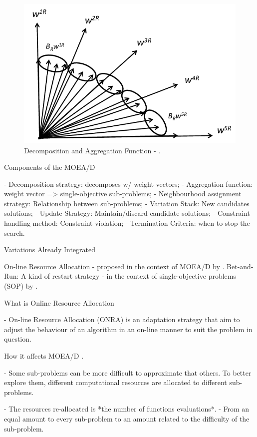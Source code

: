 \begin{figure}[!t]
	\centering
	\includegraphics[width=\textwidth]{images/decomp.png}
	\caption{Decomposition and Aggregation Function - \cite{chugh2017handling}.}
\end{figure}

Components of the MOEA/D

- Decomposition strategy: decomposes w/ weight vectors;
- Aggregation function:  weight vector => single-objective sub-problems;
- Neighbourhood assignment strategy: Relationship between sub-problems;
- Variation Stack: New candidates solutions;
- Update Strategy: Maintain/discard candidate solutions;
- Constraint handling method: Constraint violation;
- Termination Criteria: when to stop the search.

Variations Already Integrated

 On-line Resource Allocation - proposed in the context of MOEA/D by \cite{zhou2016all}.
 Bet-and-Run: A kind of restart strategy - in the context of single-objective problems (SOP) by \cite{friedrich2017generic}.

What is Online Resource Allocation 

- On-line Resource Allocation (ONRA) is an adaptation strategy that aim to adjust the behaviour of an algorithm in an on-line manner to suit the problem in question.


How it affects MOEA/D \cite{zhou2016all}.

- Some sub-problems can be more difficult to approximate that others. To better explore them, different computational resources are allocated to different sub-problems.

- The resources re-allocated is *the number of functions evaluations*.
- From an equal amount to every sub-problem to an amount related to the difficulty of the sub-problem.    


